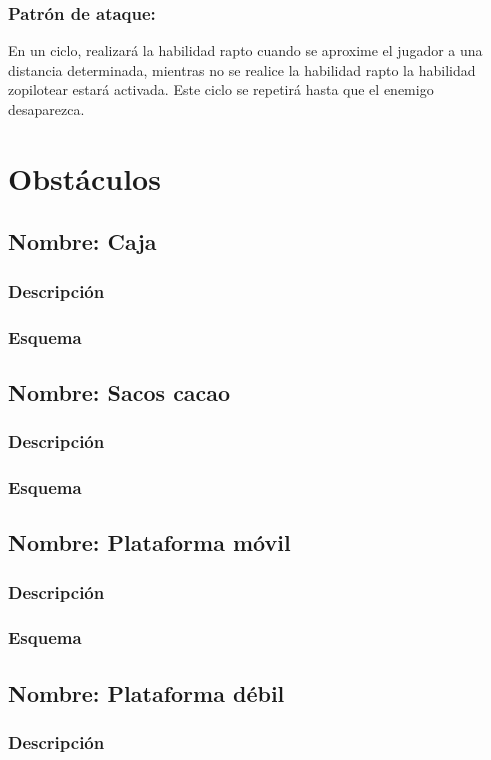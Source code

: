 \documentclass[11pt,letterpaper]{article}
\begin{document}
\subsubsection{Patrón de ataque:}
En un ciclo, realizará la habilidad rapto cuando se aproxime el jugador a una distancia determinada, mientras no se realice la habilidad rapto la habilidad zopilotear estará activada. Este ciclo se repetirá hasta que el enemigo desaparezca.

\section{Obstáculos}
	\subsection{Nombre: Caja}
\subsubsection{Descripción}
\subsubsection{Esquema}
	\subsection{Nombre: Sacos cacao}
\subsubsection{Descripción}
\subsubsection{Esquema}
	\subsection{Nombre: Plataforma móvil}
	\subsubsection{Descripción}
	\subsubsection{Esquema}
		\subsection{Nombre: Plataforma débil}
	\subsubsection{Descripción}
\end{document}

